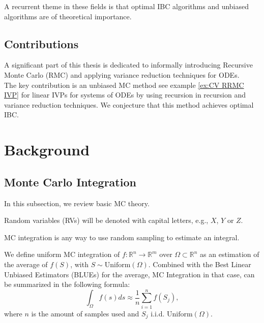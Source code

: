 \documentclass[a4paper,12pt]{article}
\begin{document}
A recurrent theme in these fields is that optimal IBC
algorithms and unbiased algorithms
are of theoretical importance.

\subsection{Contributions}

A significant part of this thesis is dedicated to
informally introducing Recursive Monte Carlo (RMC)
and applying variance reduction techniques for ODEs. \\

The key contribution is an unbiased MC method
see example \ref{ex:CV RRMC IVP} for
linear IVPs for systems of ODEs by using recursion in recursion
and variance reduction techniques.
We conjecture that this method achieves optimal IBC.

\section{Background}

\subsection{Monte Carlo Integration}

In this subsection, we review basic MC theory. \\

\begin{notation}
    Random variables (RVs) will be denoted with capital letters, e.g., $X$, $Y$ or $Z$.
\end{notation}



MC integration is any way to use random sampling to estimate an integral.
\begin{definition}
    We define uniform MC integration of
    $f:\mathbb{R}^{n} \rightarrow \mathbb{R}^{m}$
    over $\Omega \subset \mathbb{R}^{n}$ as
    an estimation of the average of $f(S)$, with
    $S \sim \text{Uniform}(\Omega)$. Combined
    with the Best Linear Unbiased Estimators (BLUEs) for the average, MC Integration
    in that case, can be summarized in the following formula:
    \begin{equation}\label{eq:BLUE}
        \int_{\Omega} f(s)ds \approx \frac{1}{n} \sum_{i=1}^{n}f(S_{j}),
    \end{equation}
    where $n$ is the amount of samples used and $S_{j}$ i.i.d. $\text{Uniform}(\Omega)$.
\end{definition}
\end{document}
